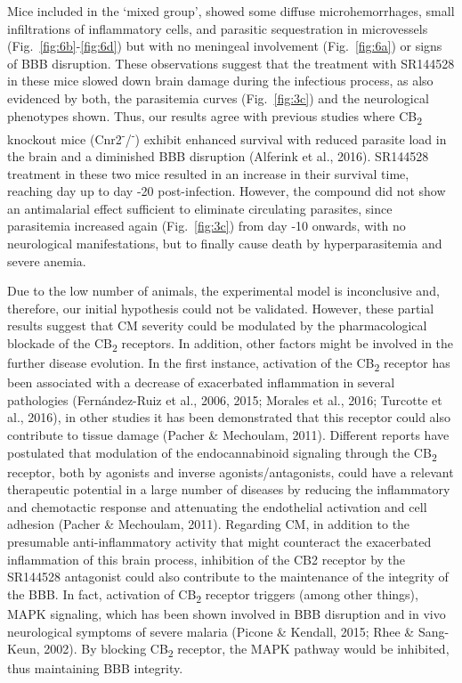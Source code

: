 \documentclass[empirical, authordate, issue]{jote-new-article}
\begin{document}
Mice included in the `mixed group', showed some diffuse microhemorrhages, small infiltrations of inflammatory cells, and parasitic sequestration in microvessels (Fig.~\ref{fig:6b}-\ref{fig:6d}) but with no meningeal involvement (Fig.~\ref{fig:6a}) or signs of BBB disruption. These observations suggest that the treatment with SR144528 in these mice slowed down brain damage during the infectious process, as also evidenced by both, the parasitemia curves (Fig.~\ref{fig:3c}) and the neurological phenotypes shown. Thus, our results agree with previous studies where CB\textsubscript{2} knockout mice (Cnr2\textsuperscript{-}/\textsuperscript{-}) exhibit enhanced survival with reduced parasite load in the brain and a diminished BBB disruption (Alferink et al., 2016). SR144528 treatment in these two mice resulted in an increase in their survival time, reaching day up to day -20 post-infection. However, the compound did not show an antimalarial effect sufficient to eliminate circulating parasites, since parasitemia increased again (Fig.~\ref{fig:3c}) from day -10 onwards, with no neurological manifestations, but to finally cause death by hyperparasitemia and severe anemia.



Due to the low number of animals, the experimental model is inconclusive and, therefore, our initial hypothesis could not be validated. However, these partial results suggest that CM severity could be modulated by the pharmacological blockade of the CB\textsubscript{2} receptors. In addition, other factors might be involved in the further disease evolution. In the first instance, activation of the CB\textsubscript{2} receptor has been associated with a decrease of exacerbated inflammation in several pathologies (Fernández-Ruiz et al., 2006, 2015; Morales et al., 2016; Turcotte et al., 2016), in other studies it has been demonstrated that this receptor could also contribute to tissue damage (Pacher \& Mechoulam, 2011). Different reports have postulated that modulation of the endocannabinoid signaling through the CB\textsubscript{2} receptor, both by agonists and inverse agonists/antagonists, could have a relevant therapeutic potential in a large number of diseases by reducing the inflammatory and chemotactic response and attenuating the endothelial activation and cell adhesion (Pacher \& Mechoulam, 2011). Regarding CM, in addition to the presumable anti-inflammatory activity that might counteract the exacerbated inflammation of this brain process, inhibition of the CB2 receptor by the SR144528 antagonist could also contribute to the maintenance of the integrity of the BBB. In fact, activation of CB\textsubscript{2} receptor triggers (among other things), MAPK signaling, which has been shown involved in BBB disruption and in vivo neurological symptoms of severe malaria (Picone \& Kendall, 2015; Rhee \& Sang-Keun, 2002). By blocking CB\textsubscript{2} receptor, the MAPK pathway would be inhibited, thus maintaining BBB integrity.
\end{document}

